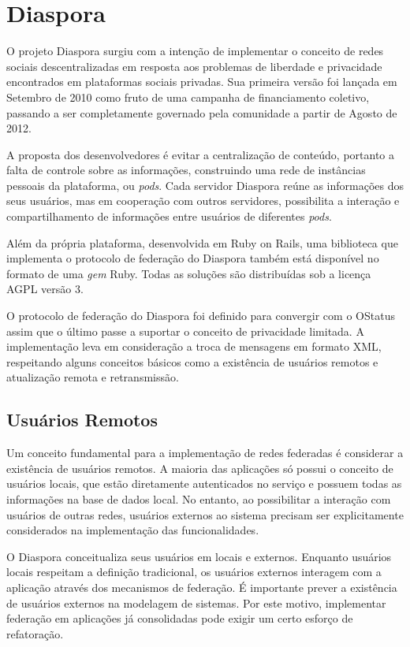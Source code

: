 \section{Diaspora}

O projeto Diaspora surgiu com a intenção de implementar o conceito de redes sociais
descentralizadas em resposta aos problemas de liberdade e privacidade encontrados
em plataformas sociais privadas. Sua primeira versão foi lançada em Setembro de 2010
como fruto de uma campanha de financiamento coletivo, passando a ser completamente
governado pela comunidade a partir de Agosto de 2012.


A proposta dos desenvolvedores é evitar a centralização de conteúdo, portanto a 
falta de controle sobre as informações, construindo uma rede de instâncias pessoais
da plataforma, ou \textit{pods}. Cada servidor Diaspora reúne as informações dos 
seus usuários, mas em cooperação com outros servidores, possibilita a interação
e compartilhamento de informações entre usuários de diferentes \textit{pods}.

Além da própria plataforma, desenvolvida em Ruby on Rails, uma biblioteca que
implementa o protocolo de federação do Diaspora também está disponível no formato
de uma \textit{gem} Ruby. Todas as soluções são distribuídas sob a licença AGPL 
versão 3. 

O protocolo de federação do Diaspora foi definido para convergir com o OStatus
assim que o último passe a suportar o conceito de privacidade limitada. A
implementação leva em consideração a troca de mensagens em formato XML, respeitando
alguns conceitos básicos como a existência de usuários remotos e atualização remota
e retransmissão.

\subsection{Usuários Remotos}

Um conceito fundamental para a implementação de redes federadas é considerar a
existência de usuários remotos. A maioria das aplicações só possui o conceito de
usuários locais, que estão diretamente autenticados no serviço e possuem todas as
informações na base de dados local. No entanto, ao possibilitar a interação com
usuários de outras redes, usuários externos ao sistema precisam ser explicitamente
considerados na implementação das funcionalidades.

O Diaspora conceitualiza seus usuários em locais e externos. Enquanto usuários
locais respeitam a definição tradicional, os usuários externos interagem com a
aplicação através dos mecanismos de federação. É importante prever a existência de
usuários externos na modelagem de sistemas. Por este motivo, implementar federação
em aplicações já consolidadas pode exigir um certo esforço de refatoração. %

